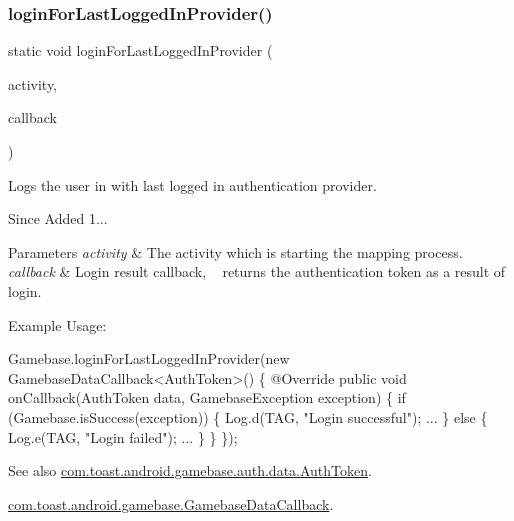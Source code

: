 \subsubsection{\texorpdfstring{login\+For\+Last\+Logged\+In\+Provider()}{loginForLastLoggedInProvider()}}
{\footnotesize\ttfamily static void login\+For\+Last\+Logged\+In\+Provider (\begin{DoxyParamCaption}\item[{@Non\+Null final Activity}]{activity,  }\item[{@Nullable final \hyperlink{interfacecom_1_1toast_1_1android_1_1gamebase_1_1_gamebase_data_callback}{Gamebase\+Data\+Callback}$<$ \hyperlink{classcom_1_1toast_1_1android_1_1gamebase_1_1auth_1_1data_1_1_auth_token}{Auth\+Token} $>$}]{callback }\end{DoxyParamCaption})\hspace{0.3cm}{\ttfamily [static]}}



Logs the user in with last logged in authentication provider. 

\begin{DoxySince}{Since}
Added 1... 
\end{DoxySince}

\begin{DoxyParams}{Parameters}
{\em activity} & The activity which is starting the mapping process. \\
\hline
{\em callback} & Login result callback, ~\newline
 returns the authentication token as a result of login.\\
\hline
\end{DoxyParams}
Example Usage\+: 
\begin{DoxyCode}
Gamebase.loginForLastLoggedInProvider(\textcolor{keyword}{new} GamebaseDataCallback<AuthToken>() \{
    @Override
    \textcolor{keyword}{public} \textcolor{keywordtype}{void} onCallback(AuthToken data, GamebaseException exception) \{
        \textcolor{keywordflow}{if} (Gamebase.isSuccess(exception)) \{
            Log.d(TAG, \textcolor{stringliteral}{"Login successful"});
            ...
        \} \textcolor{keywordflow}{else} \{
            Log.e(TAG, \textcolor{stringliteral}{"Login failed"});
            ...
        \}
    \}
\});
\end{DoxyCode}


\begin{DoxySeeAlso}{See also}
\hyperlink{classcom_1_1toast_1_1android_1_1gamebase_1_1auth_1_1data_1_1_auth_token}{com.\+toast.\+android.\+gamebase.\+auth.\+data.\+Auth\+Token}. 

\hyperlink{interfacecom_1_1toast_1_1android_1_1gamebase_1_1_gamebase_data_callback}{com.\+toast.\+android.\+gamebase.\+Gamebase\+Data\+Callback}. 
\end{DoxySeeAlso}
\mbox{\label{classcom_1_1toast_1_1android_1_1gamebase_1_1_gamebase_a46e0cbaa0ed64f4c0eb66e137bfcf4d4}} 
